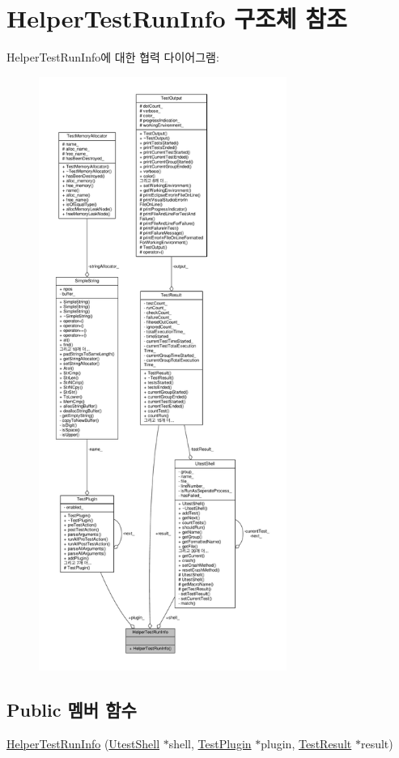 \hypertarget{struct_helper_test_run_info}{}\section{Helper\+Test\+Run\+Info 구조체 참조}
\label{struct_helper_test_run_info}


Helper\+Test\+Run\+Info에 대한 협력 다이어그램\+:
\nopagebreak
\begin{figure}[H]
\begin{center}
\leavevmode
\includegraphics[height=550pt]{struct_helper_test_run_info__coll__graph}
\end{center}
\end{figure}
\subsection*{Public 멤버 함수}
\begin{DoxyCompactItemize}
\item 
\hyperlink{struct_helper_test_run_info_a901754a05b369bd0abd9e6cc42ff71e2}{Helper\+Test\+Run\+Info} (\hyperlink{class_utest_shell}{Utest\+Shell} $\ast$shell, \hyperlink{class_test_plugin}{Test\+Plugin} $\ast$plugin, \hyperlink{class_test_result}{Test\+Result} $\ast$result)
\end{DoxyCompactItemize}
